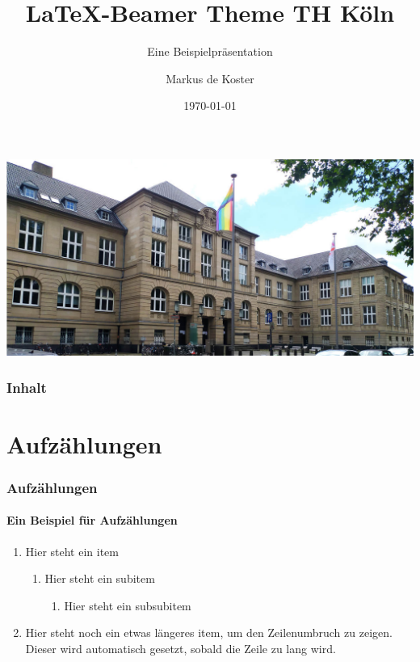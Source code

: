\documentclass{beamer}
\title{\LaTeX -Beamer Theme TH Köln}
\subtitle[Beispielpräsi]{Eine Beispielpräsentation}
\institute[TH Köln]{Technische Hochschule Köln}
\date[\ddmmyyyydate\today]{\today} %
\author[de Koster]{Markus de Koster}
\begin{document}
\begin{frame}
    \vspace{2em} %
    \includegraphics[width=\textwidth]{figures/thk.jpg}
    \titlepage
\end{frame}

\begin{frame}
    \frametitle{Inhalt}
    \tableofcontents
\end{frame}

\section{Aufzählungen}\label{sec:enumerations}
\begin{frame} 
    \frametitle{Aufzählungen} 
    \framesubtitle{Ein Beispiel für Aufzählungen} 
    \begin{enumerate} 
        \item Hier steht ein item 
        \begin{enumerate} 
            \item Hier steht ein subitem
            \begin{enumerate} 
                \item Hier steht ein subsubitem
            \end{enumerate}
        \end{enumerate}
        \item Hier steht noch ein etwas längeres item, um den Zeilenumbruch zu zeigen. 
        Dieser wird automatisch gesetzt, sobald die Zeile zu lang wird.
    \end{enumerate}
\end{frame}
\end{document}
